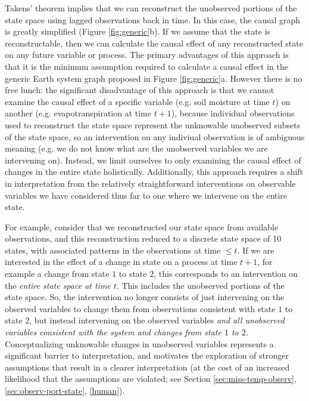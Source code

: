 \documentclass[12pt]{article}
\begin{document}
Takens' theorem implies that we can reconstruct the unobserved
portions of the state space using lagged observations back in time. In
this case, the causal graph is greatly simplified (Figure
\ref{fig:generic}b). If we assume that the state is reconstructable,
then we can calculate the causal effect of any reconstructed state on
any future variable or process. The primary advantages of this
approach is that it is the minimum assumption required to calculate a
causal effect in the generic Earth system graph proposed in Figure
\ref{fig:generic}a. However there is no free lunch: the significant
disadvantage of this approach is that we cannot examine the causal
effect of a specific variable (e.g. soil moisture at time $t$) on
another (e.g. evapotranspiration at time $t+1$), because individual
observations used to reconstruct the state space represent the
unknowable unobserved subsets of the state space, so an intervention
on any indiviual observation is of ambiguous meaning (e.g. we do not
know what are the unobserved variables we are intervening
on). Instead, we limit ourselves to only examining the causal effect
of changes in the entire state holistically. Additionally, this
approach requires a shift in interpretation from the relatively
straightforward interventions on observable variables we have
considered thus far to one where we intervene on the entire state.

For example, consider that we reconstructed our state space from
available observations, and this reconstruction reduced to a discrete
state space of 10 states, with associated patterns in the observations
at time $\leq t$. If we are interested in the effect of a change in
state on a process at time $t+1$, for example a change from state $1$
to state $2$, this corresponds to an intervention on the
\textit{entire state space at time $t$}. This includes the unobserved
portions of the state space. So, the intervention no longer consists
of just intervening on the observed variables to change them from
observations consistent with state $1$ to state $2$, but instead
intervening on the observed variables \emph{and all unobserved
  variables consistent with the system and changes from state $1$ to
  $2$.}  Conceptualizing unknowable changes in unobserved variables
represents a significant barrier to interpretation, and motivates the
exploration of stronger assumptions that result in a clearer
interpretation (at the cost of an increased likelihood that the
assumptions are violated; see Section \ref{sec:miss-temp-observ},
\ref{sec:observ-port-state}, \ref{human}).
\end{document}
